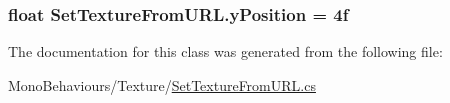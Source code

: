 \subsubsection[{\texorpdfstring{y\+Position}{yPosition}}]{\setlength{\rightskip}{0pt plus 5cm}float Set\+Texture\+From\+U\+R\+L.\+y\+Position = 4f}\hypertarget{class_set_texture_from_u_r_l_abb0d4851e3480a64f463386f06baeac9}{}\label{class_set_texture_from_u_r_l_abb0d4851e3480a64f463386f06baeac9}


The documentation for this class was generated from the following file\+:\begin{DoxyCompactItemize}
\item 
Mono\+Behaviours/\+Texture/\hyperlink{_set_texture_from_u_r_l_8cs}{Set\+Texture\+From\+U\+R\+L.\+cs}\end{DoxyCompactItemize}
